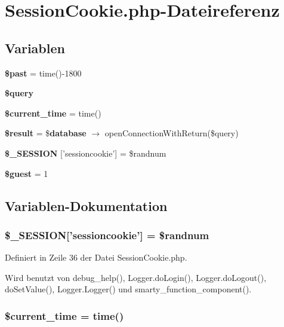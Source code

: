 \section{SessionCookie.php-Dateireferenz}
\label{SessionCookie_8php}
\subsection*{Variablen}
\begin{CompactItemize}
\item 
{\bf \$past} = time()-1800
\item 
{\bf \$query}
\item 
{\bf \$current\_\-time} = time()
\item 
{\bf \$result} = \${\bf database} $\rightarrow$ openConnectionWithReturn(\$query)
\item 
{\bf \$\_\-SESSION} ['sessioncookie'] = \$randnum
\item 
{\bf \$guest} = 1
\end{CompactItemize}


\subsection{Variablen-Dokumentation}
\subsubsection{\setlength{\rightskip}{0pt plus 5cm}\$\_\-SESSION['sessioncookie'] = \$randnum}\label{SessionCookie_8php_93d36a95c848bb1af38554eb7ecd6174}




Definiert in Zeile 36 der Datei SessionCookie.php.

Wird benutzt von debug\_\-help(), Logger.doLogin(), Logger.doLogout(), doSetValue(), Logger.Logger() und smarty\_\-function\_\-component().
\subsubsection{\setlength{\rightskip}{0pt plus 5cm}\$current\_\-time = time()}\label{SessionCookie_8php_63faaf6695dbb6b199cd3fc5a5de124f}




